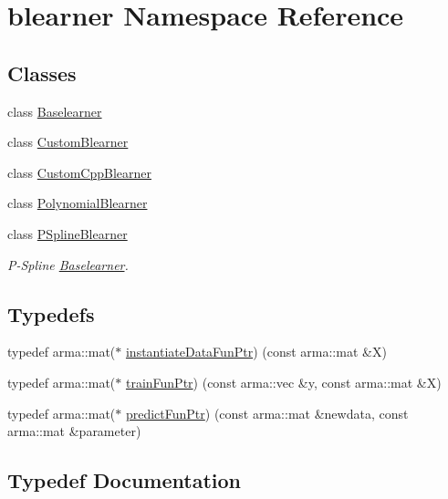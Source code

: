 \hypertarget{namespaceblearner}{}\section{blearner Namespace Reference}
\label{namespaceblearner}
\subsection*{Classes}
\begin{DoxyCompactItemize}
\item 
class \mbox{\hyperlink{classblearner_1_1_baselearner}{Baselearner}}
\item 
class \mbox{\hyperlink{classblearner_1_1_custom_blearner}{Custom\+Blearner}}
\item 
class \mbox{\hyperlink{classblearner_1_1_custom_cpp_blearner}{Custom\+Cpp\+Blearner}}
\item 
class \mbox{\hyperlink{classblearner_1_1_polynomial_blearner}{Polynomial\+Blearner}}
\item 
class \mbox{\hyperlink{classblearner_1_1_p_spline_blearner}{P\+Spline\+Blearner}}
\begin{DoxyCompactList}\small\item\em P-\/\+Spline \mbox{\hyperlink{classblearner_1_1_baselearner}{Baselearner}}. \end{DoxyCompactList}\end{DoxyCompactItemize}
\subsection*{Typedefs}
\begin{DoxyCompactItemize}
\item 
typedef arma\+::mat($\ast$ \mbox{\hyperlink{namespaceblearner_a10cec16134a934fb9defbdc2c2011f2a}{instantiate\+Data\+Fun\+Ptr}}) (const arma\+::mat \&X)
\item 
typedef arma\+::mat($\ast$ \mbox{\hyperlink{namespaceblearner_a5e2b38edf05e32681bee136af9ae505d}{train\+Fun\+Ptr}}) (const arma\+::vec \&y, const arma\+::mat \&X)
\item 
typedef arma\+::mat($\ast$ \mbox{\hyperlink{namespaceblearner_a93d5b51440d434704d2bde9dee652f6e}{predict\+Fun\+Ptr}}) (const arma\+::mat \&newdata, const arma\+::mat \&parameter)
\end{DoxyCompactItemize}


\subsection{Typedef Documentation}
\mbox{\label{namespaceblearner_a10cec16134a934fb9defbdc2c2011f2a}} 
